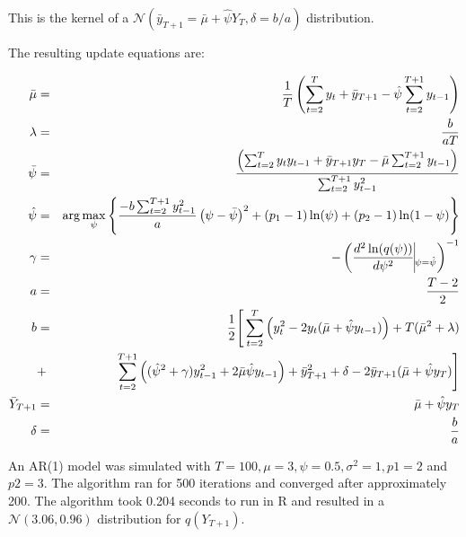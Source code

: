 \documentclass{article}
\begin{document}
This is the kernel of a $\mathcal{N}\left(\bar{y}_{T+1} = \bar{\mu} + \hat{\psi}Y_{T}, \delta = b/a \right)$ distribution.

The resulting update equations are:

\begin{eqnarray*}
\label{update}
\bar{\mu} & = & \frac{1}{T} \left(\sum^{T}_{t=2}y_t + \bar{y}_{T+1} - \hat{\psi}\sum^{T+1}_{t=2}y_{t-1} \right) \\
\lambda & = & \frac{b}{aT} \\
\bar{\psi} & = &\frac{\left(\sum^{T}_{t=2} y_t y_{t-1} + \bar{y}_{T+1}y_T - \bar{\mu} \sum^{T+1}_{t=2} y_{t-1} \right)}{\sum^{T+1}_{t=2} y_{t-1}^2} \\
\hat{\psi} & = & \arg \max_{\psi} \left\{  \frac{-b\sum^{T+1}_{t=2} y_{t-1}^2}{a} \left(\psi - \bar{\psi} \right)^2 + (p_1-1) \ln(\psi) + (p_2-1)\ln(1-\psi) \right\} \\
\gamma & = & -\left(\frac{d^2 \ln(q(\psi))}{d \psi^2} \vline_{\psi = \hat{\psi}}\right)^{-1} \\
a & = & \frac{T-2}{2} \\
b & = & \frac{1}{2} \Bigg[\sum^{T}_{t=2}\left(y_t^2-2y_t(\bar{\mu}+\hat{\psi}y_{t-1})\right) + T(\bar{\mu}^2 + \lambda) \\
& + &  \sum^{T+1}_{t=2}\left((\hat{\psi}^2+\gamma)y_{t-1}^2 + 2\bar{\mu}\hat{\psi}y_{t-1}\right) + \bar{y}_{T+1}^2 + \delta - 2 \bar{y}_{T+1} (\bar{\mu} + \hat{\psi}y_T) \Bigg] \\
\bar{Y}_{T+1} & = & \bar{\mu} + \hat{\psi}y_T \\
\delta & = & \frac{b}{a}
\end{eqnarray*}

An AR(1) model was simulated with $T=100, \mu = 3, \psi = 0.5, \sigma^2 = 1, p1 = 2$ and $p2 = 3$. The algorithm ran for 500 iterations and converged after approximately 200. The algorithm took 0.204 seconds to run in R and resulted in a $\mathcal{N}(3.06, 0.96)$ distribution for $q(Y_{T+1})$.
\end{document}
